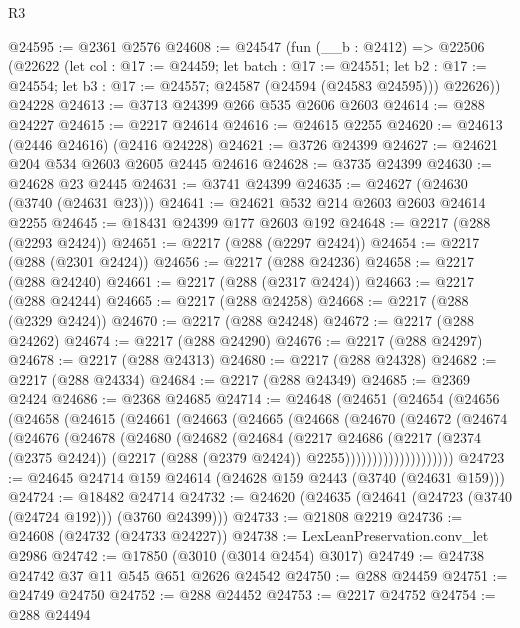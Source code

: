 \begin{lexlean}{R3}
\begin{coremodule}
@24595 := @2361 @2576
@24608 := @24547
    (fun (__b : @2412) =>
    @22506
      (@22622
        (let col : @17 := @24459;
        let batch : @17 := @24551;
        let b2 : @17 := @24554; let b3 : @17 := @24557; @24587 (@24594 (@24583 @24595)))
        @22626))
    @24228
@24613 := @3713 @24399 @266 @535 @2606 @2603
@24614 := @288 @24227
@24615 := @2217 @24614
@24616 := @24615 @2255
@24620 := @24613 (@2446 @24616) (@2416 @24228)
@24621 := @3726 @24399
@24627 := @24621 @204 @534 @2603 @2605 @2445 @24616
@24628 := @3735 @24399
@24630 := @24628 @23 @2445
@24631 := @3741 @24399
@24635 := @24627 (@24630 (@3740 (@24631 @23)))
@24641 := @24621 @532 @214 @2603 @2603 @24614 @2255
@24645 := @18431 @24399 @177 @2603 @192
@24648 := @2217 (@288 (@2293 @2424))
@24651 := @2217 (@288 (@2297 @2424))
@24654 := @2217 (@288 (@2301 @2424))
@24656 := @2217 (@288 @24236)
@24658 := @2217 (@288 @24240)
@24661 := @2217 (@288 (@2317 @2424))
@24663 := @2217 (@288 @24244)
@24665 := @2217 (@288 @24258)
@24668 := @2217 (@288 (@2329 @2424))
@24670 := @2217 (@288 @24248)
@24672 := @2217 (@288 @24262)
@24674 := @2217 (@288 @24290)
@24676 := @2217 (@288 @24297)
@24678 := @2217 (@288 @24313)
@24680 := @2217 (@288 @24328)
@24682 := @2217 (@288 @24334)
@24684 := @2217 (@288 @24349)
@24685 := @2369 @2424
@24686 := @2368 @24685
@24714 := @24648
    (@24651
      (@24654
        (@24656
          (@24658
            (@24615
              (@24661
                (@24663
                  (@24665
                    (@24668
                      (@24670
                        (@24672
                          (@24674
                            (@24676
                              (@24678
                                (@24680
                                  (@24682
                                    (@24684
                                      (@2217
                                        @24686
                                        (@2217
                                          (@2374 (@2375 @2424))
                                          (@2217 (@288 (@2379 @2424)) @2255))))))))))))))))))))
@24723 := @24645 @24714 @159 @24614 (@24628 @159 @2443 (@3740 (@24631 @159)))
@24724 := @18482 @24714
@24732 := @24620 (@24635 (@24641 (@24723 (@3740 (@24724 @192))) (@3760 @24399)))
@24733 := @21808 @2219
@24736 := @24608 (@24732 (@24733 @24227))
@24738 := LexLeanPreservation.conv_let @2986
@24742 := @17850 (@3010 (@3014 @2454) @3017)
@24749 := @24738 @24742 @37 @11 @545 @651 @2626 @24542
@24750 := @288 @24459
@24751 := @24749 @24750
@24752 := @288 @24452
@24753 := @2217 @24752
@24754 := @288 @24494

\end{coremodule}
\end{lexlean}
